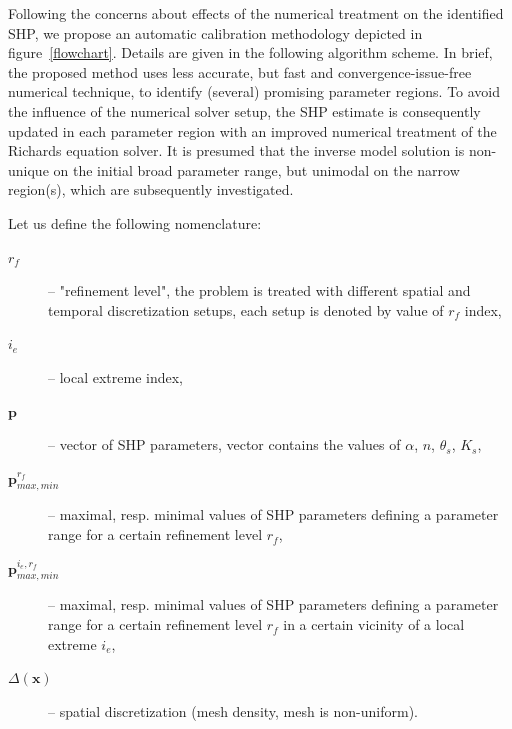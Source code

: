 \documentclass[review,times,3p,10pt]{elsarticle}
\renewcommand{\vec}{\mathbf}
\begin{document}
Following the concerns about effects of the numerical treatment on the identified SHP, we propose an automatic calibration methodology depicted in figure~\ref{flowchart}. Details are given in the following algorithm scheme. In brief, the proposed method uses less accurate, but fast and convergence-issue-free numerical technique, to identify (several) promising parameter regions. To avoid the influence of the numerical solver setup,  the SHP estimate is consequently updated in each parameter region with an improved numerical treatment of the Richards equation solver. It is presumed that the inverse model solution is non-unique on the initial broad parameter range, but unimodal on the narrow region(s), which are subsequently investigated. 

Let us define the following nomenclature: %

\hrulefill
\begin{description}
\item[$r_f$] -- "refinement level", the problem is treated with different spatial and temporal discretization setups, each setup is denoted by value of $r_f$ index,
\item[$i_e$] -- local extreme index,
\item[$\vec{p}$] -- vector of SHP parameters, vector contains the values of $\alpha$, $n$, $\theta_s$, $K_s$,
\item[$\vec{p}_{max,min}^{r_f}$] -- maximal, resp. minimal values of SHP parameters defining a parameter range for a certain refinement level $r_f$,
\item[$\vec{p}_{max,min}^{ i_e, r_f}$] -- maximal, resp. minimal values of SHP parameters defining a parameter range for a certain refinement level $r_f$ in a certain vicinity of a local extreme $i_e$,
\item[$\Delta(\vec{x})$] -- spatial discretization (mesh density, mesh is non-uniform).
\end{description}
\hrulefill
\end{document}
